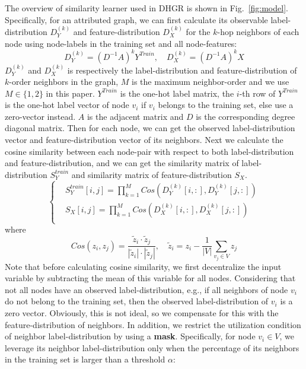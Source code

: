 \documentclass[sigconf]{acmart}
\begin{document}
	The overview of similarity learner used in DHGR is shown in Fig.~\ref{fig:model}. Specifically, for an attributed graph, we can first calculate its observable label-distribution $D_Y^{(k)}$ and feature-distribution $D_X^{(k)}$ for the $k$-hop neighbors of each node using node-labels in the training set and all node-features:
	\begin{equation}
	\label{eq:dist}
	D_Y^{(k)} = (D^{-1}A)^{k}Y^{Train},\quad D_X^{(k)} = (D^{-1}A)^kX
	\end{equation}
	$D_Y^{(k)}$ and $D_X^{(k)}$ is respectively the label-distribution and feature-distribution of $k$-order neighbors in the graph, $M$ is the maximum neighbor-order and we use $M \in \{1,2\}$ in this paper. $Y^{Train}$ is the one-hot label matrix, the $i$-th row of $Y^{Train}$ is the one-hot label vector of node $v_i$ if $v_i$ belongs to the training set, else use a zero-vector instead. $A$ is the adjacent matrix and $D$ is the corresponding degree diagonal matrix. Then for each node, we can get the observed label-distribution vector and feature-distribution vector of its neighbors. Next we calculate the cosine similarity between each node-pair with respect to both label-distribution and feature-distribution, and we can get the similarity matrix of label-distribution $S_Y^{train}$ and similarity matrix of feature-distribution $S_X$.
	\begin{equation}
	\label{eq:x_y_sim}
	\left\{ \begin{aligned}
	&S_Y^{train}[i,j] = \prod_{k=1}^{M} Cos\left({D}_Y^{(k)}[i, :], {D}_Y^{(k)}[j, :]\right) \\
	&S_X[i, j] = \prod_{k=1}^{M} Cos\left({D}_X^{(k)}[i, :], {D}_X^{(k)}[j, :]\right)  \\
	\end{aligned} \right.
	\end{equation}
	where
	\begin{equation}
	\label{eq:cos}
	Cos(z_i, z_j) = \frac{\widetilde{z}_i\cdot \widetilde{z}_j}{|\widetilde{z}_i|\cdot |\widetilde{z}_j|}, \quad \widetilde{z}_i = z_i - \frac{1}{|V|}\sum_{v_j\in V} z_j
	\end{equation}
	Note that before calculating cosine similarity, we first decentralize the input variable by subtracting the mean of this variable for all nodes. Considering that not all nodes have an observed label-distribution, e.g., if all neighbors of node $v_i$ do not belong to the training set, then the observed label-distribution of $v_i$ is a zero vector. Obviously, this is not ideal, so we compensate for this with the feature-distribution of neighbors. In addition, we restrict the utilization condition of neighbor label-distribution by using a \textbf{mask}. Specifically, for node $v_i\in V$, we  leverage its neighbor label-distribution only when the percentage of its neighbors in the training set is larger than a threshold $\alpha$: 
\end{document}

